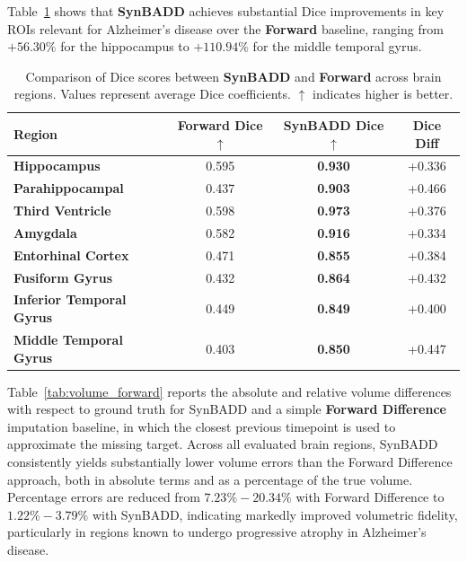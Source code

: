 Table~\ref{tab:dice_forward} shows that \textbf{SynBADD} achieves substantial Dice improvements in key ROIs relevant for Alzheimer’s disease over the \textbf{Forward} baseline, ranging from $+56.30\%$ for the hippocampus to $+110.94\%$ for the middle temporal gyrus.

\begin{table}[ht]
\centering
\caption{Comparison of Dice scores between \textbf{SynBADD} and \textbf{Forward} across brain regions. Values represent average Dice coefficients. $\uparrow$ indicates higher is better.}
\small
\begin{tabular}{>{\bfseries}lccc}
\toprule
Region & Forward Dice $\uparrow$ & SynBADD Dice $\uparrow$ & Dice Diff \\
\midrule
Hippocampus             & 0.595 & \textbf{0.930} & +0.336 \\
Parahippocampal         & 0.437 & \textbf{0.903} & +0.466 \\
Third Ventricle         & 0.598 & \textbf{0.973} & +0.376 \\
Amygdala                & 0.582 & \textbf{0.916} & +0.334 \\
Entorhinal Cortex       & 0.471 & \textbf{0.855} & +0.384 \\
Fusiform Gyrus          & 0.432 & \textbf{0.864} & +0.432 \\
Inferior Temporal Gyrus & 0.449 & \textbf{0.849} & +0.400 \\
Middle Temporal Gyrus   & 0.403 & \textbf{0.850} & +0.447 \\
\bottomrule
\end{tabular}
\label{tab:dice_forward}
\end{table}

Table~\ref{tab:volume_forward} reports the absolute and relative volume differences with respect to ground truth for SynBADD and a simple \textbf{Forward Difference} imputation baseline, in which the closest previous timepoint is used to approximate the missing target. Across all evaluated brain regions, SynBADD consistently yields substantially lower volume errors than the Forward Difference approach, both in absolute terms and as a percentage of the true volume. Percentage errors are reduced from $7.23\%\!-\!20.34\%$ with Forward Difference to $1.22\%\!-\!3.79\%$ with SynBADD, indicating markedly improved volumetric fidelity, particularly in regions known to undergo progressive atrophy in Alzheimer’s disease.


